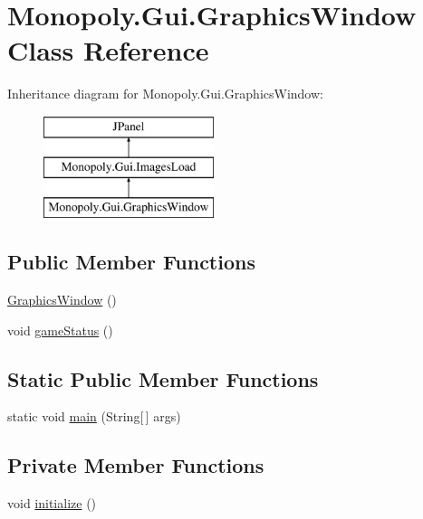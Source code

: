 \hypertarget{class_monopoly_1_1_gui_1_1_graphics_window}{}\section{Monopoly.\+Gui.\+Graphics\+Window Class Reference}
\label{class_monopoly_1_1_gui_1_1_graphics_window}
Inheritance diagram for Monopoly.\+Gui.\+Graphics\+Window\+:\begin{figure}[H]
\begin{center}
\leavevmode
\includegraphics[height=3.000000cm]{class_monopoly_1_1_gui_1_1_graphics_window}
\end{center}
\end{figure}
\subsection*{Public Member Functions}
\begin{DoxyCompactItemize}
\item 
\hyperlink{class_monopoly_1_1_gui_1_1_graphics_window_abdd7511395d6a4afd617d3a7fee618cf}{Graphics\+Window} ()
\item 
void \hyperlink{class_monopoly_1_1_gui_1_1_graphics_window_a8bafa0e5f4f8e1912bd834d58fc648cb}{game\+Status} ()
\end{DoxyCompactItemize}
\subsection*{Static Public Member Functions}
\begin{DoxyCompactItemize}
\item 
static void \hyperlink{class_monopoly_1_1_gui_1_1_graphics_window_a1e1d248ae01ec37b02567e8e47a91763}{main} (String\mbox{[}$\,$\mbox{]} args)
\end{DoxyCompactItemize}
\subsection*{Private Member Functions}
\begin{DoxyCompactItemize}
\item 
void \hyperlink{class_monopoly_1_1_gui_1_1_graphics_window_a700f7b4000e6b02ebe2229bb6ba77514}{initialize} ()
\end{DoxyCompactItemize}
